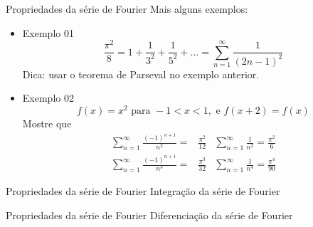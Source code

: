       \begin{slide}[toc = ]{Propriedades da série de Fourier}
	      Mais alguns exemplos:
	      \begin{itemize}
		      \item Exemplo 01
			      \begin{equation*}
				      \frac{\pi^2}{8} = 1+\frac{1}{3^2} +\frac{1}{5^2} +\dots = \sum_{n=1}^\infty \frac{1}{(2n-1)^2}
			      \end{equation*}
			      Dica: usar o teorema de Parseval no exemplo anterior.
		      \item Exemplo 02
			      \begin{equation*}
				      f(x) = x^2 \text{ para } -1<x<1, \text { e } f(x+2) = f(x)
			      \end{equation*}
			      Mostre que
				      \begin{align*}
					      \sum_{n=1}^\infty \frac{(-1)^{n+1}}{n^2} =& \frac{\pi^2}{12} &
					      \sum_{n=1}^\infty \frac{1}{n^2} = \frac{\pi^2}{6}\\
					      \sum_{n=1}^\infty \frac{(-1)^{n+1}}{n^3} =& \frac{\pi^3}{32} &
					      \sum_{n=1}^\infty \frac{1}{n^4} = \frac{\pi^4}{90}
				      \end{align*}

	      \end{itemize}
      \end{slide}
      \begin{slide}[toc = ]{Propriedades da série de Fourier}
	      Integração da série de Fourier
      \end{slide}

      \begin{slide}[toc = ]{Propriedades da série de Fourier}
	      Diferenciação da série de Fourier
      \end{slide}


